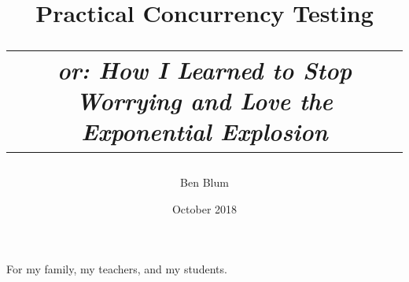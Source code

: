 \documentclass[12pt]{cmuthesis}
\begin{document}
\frontmatter

\pagestyle{empty}

\title{ %
{\bf Practical Concurrency Testing} \\
\normalsize \vspace{1em}
\begin{tabular}{c}
{\em or: How I Learned to Stop Worrying and Love the Exponential Explosion}
\end{tabular}}
\author{Ben Blum}
\date{October 2018}
\trnumber{}


\support{}
\disclaimer{}



\maketitle

\begin{dedication}
For my family, my teachers, and my students.
\end{dedication}

\pagestyle{plain} %
\end{document}

